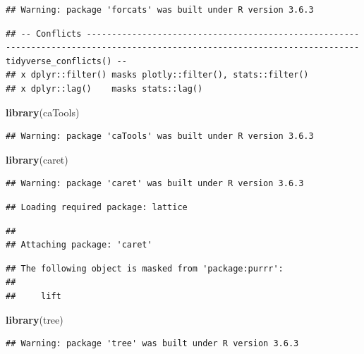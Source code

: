 \documentclass[
]{article}
\newenvironment{Shaded}{\begin{snugshade}}{\end{snugshade}}
\newcommand{\KeywordTok}[1]{\textcolor[rgb]{0.13,0.29,0.53}{\textbf{#1}}}
\newcommand{\NormalTok}[1]{#1}
\begin{document}
\begin{verbatim}
## Warning: package 'forcats' was built under R version 3.6.3
\end{verbatim}

\begin{verbatim}
## -- Conflicts ---------------------------------------------------------------------------------------------------------------------------- tidyverse_conflicts() --
## x dplyr::filter() masks plotly::filter(), stats::filter()
## x dplyr::lag()    masks stats::lag()
\end{verbatim}

\begin{Shaded}
\begin{Highlighting}[]
\KeywordTok{library}\NormalTok{(caTools)}
\end{Highlighting}
\end{Shaded}

\begin{verbatim}
## Warning: package 'caTools' was built under R version 3.6.3
\end{verbatim}

\begin{Shaded}
\begin{Highlighting}[]
\KeywordTok{library}\NormalTok{(caret)}
\end{Highlighting}
\end{Shaded}

\begin{verbatim}
## Warning: package 'caret' was built under R version 3.6.3
\end{verbatim}

\begin{verbatim}
## Loading required package: lattice
\end{verbatim}

\begin{verbatim}
## 
## Attaching package: 'caret'
\end{verbatim}

\begin{verbatim}
## The following object is masked from 'package:purrr':
## 
##     lift
\end{verbatim}

\begin{Shaded}
\begin{Highlighting}[]
\KeywordTok{library}\NormalTok{(tree)}
\end{Highlighting}
\end{Shaded}

\begin{verbatim}
## Warning: package 'tree' was built under R version 3.6.3
\end{verbatim}
\end{document}
